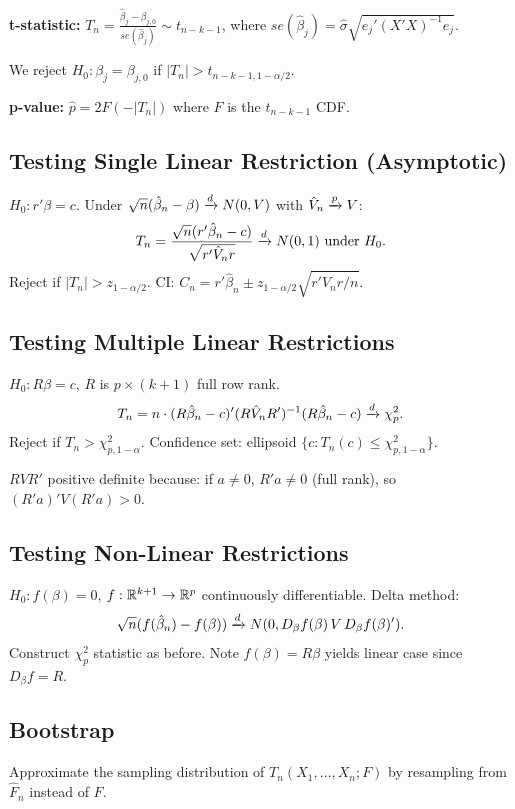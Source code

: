 \textbf{t-statistic:} $T_n=\frac{\hat\beta_j-\beta_{j,0}}{se(\hat\beta_j)}\sim t_{n-k-1}$, where $se(\hat\beta_j)=\hat\sigma\sqrt{e_j'(X'X)^{-1}e_j}$.

We reject $H_0:\beta_j=\beta_{j,0}$ if $|T_n|>t_{n-k-1,1-\alpha/2}$.

\textbf{p-value:} $\hat{p}=2F(-|T_n|)$ where $F$ is the $t_{n-k-1}$ CDF.

\subsection{Testing Single Linear Restriction (Asymptotic)}
$H_0: r'\beta=c$. Under $\sqrt{n}(\hat\beta_n-\beta)\xrightarrow{d} N(0,V)$ with $\hat{V}_n\xrightarrow{p} V$:
\begin{align*}
    T_n = \frac{\sqrt{n}(r'\hat\beta_n - c)}{\sqrt{r'\hat{V}_n r}}\xrightarrow{d} N(0,1) \text{ under } H_0.
\end{align*}
Reject if $|T_n|>z_{1-\alpha/2}$. CI: $C_n = r'\hat\beta_n \pm z_{1-\alpha/2}\sqrt{r'\hat{V}_n r/n}$.

\subsection{Testing Multiple Linear Restrictions}
$H_0: R\beta=c$, $R$ is $p\times(k+1)$ full row rank.
\begin{align*}
    T_n = n\cdot(R\hat\beta_n-c)'(R\hat{V}_nR')^{-1}(R\hat\beta_n-c)\xrightarrow{d}\chi^2_p.
\end{align*}
Reject if $T_n>\chi^2_{p,1-\alpha}$. Confidence set: ellipsoid $\{c: T_n(c)\leq\chi^2_{p,1-\alpha}\}$.

$RVR'$ positive definite because: if $a\neq 0$, $R'a\neq 0$ (full rank), so $(R'a)'V(R'a)>0$.

\subsection{Testing Non-Linear Restrictions}
$H_0: f(\beta)=0$, $f:\mathbb{R}^{k+1}\to\mathbb{R}^p$ continuously differentiable. Delta method:
\begin{align*}
    \sqrt{n}(f(\hat\beta_n)-f(\beta))\xrightarrow{d} N(0,D_\beta f(\beta)\,V\,D_\beta f(\beta)').
\end{align*}
Construct $\chi^2_p$ statistic as before. Note $f(\beta)=R\beta$ yields linear case since $D_\beta f = R$.

\subsection{Bootstrap}
Approximate the sampling distribution of $T_n(X_1,\ldots,X_n; F)$ by resampling from $\hat F_n$ instead of $F$.

